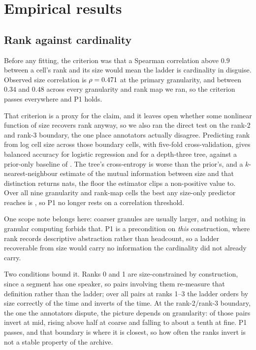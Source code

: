 \documentclass[conference]{IEEEtran}
\begin{document}
\section{Empirical results}

\subsection{Rank against cardinality}

Before any fitting, the criterion was that a Spearman correlation above $0.9$ between a cell's
rank and its size would mean the ladder is cardinality in disguise. Observed size
correlation is
$\rho = 0.471{}$ at the primary granularity, and between $0.34$ and $0.48$ across
every granularity and rank map we ran, so the criterion passes everywhere and P1 holds.

That criterion is a proxy for the claim, and it
leaves open whether some nonlinear function of size recovers rank anyway, so
we also ran the direct test on the rank-2 and rank-3 boundary, the one place annotators
actually disagree. Predicting rank from log cell size across those \sizeOnlyN{} boundary
cells, with
five-fold cross-validation, gives balanced accuracy \sizeOnlyLogit{} for logistic regression
and \sizeOnlyTree{} for a depth-three tree, against a prior-only baseline of
\sizeOnlyPrior{}. The tree's cross-entropy is worse than the prior's, and a
$k$-nearest-neighbour estimate of the mutual information between size and that distinction
returns \sizeOnlyMI{} nats, the floor the estimator clips a non-positive value to. Over all
nine granularity and rank-map cells the best any size-only predictor reaches is
\sizeOnlyMax{}, so P1 no longer rests on a correlation threshold.

One scope note belongs here: coarser granules are usually larger, and nothing in granular
computing forbids that. P1 is a precondition on \emph{this} construction, where rank
records
descriptive abstraction rather than headcount, so a ladder recoverable from size would carry
no information the cardinality did not already carry.

Two conditions bound it. Ranks 0 and 1 are
size-constrained by construction, since a segment has one speaker, so pairs involving them
re-measure that definition rather than the ladder; over all pairs at ranks 1--3 the ladder
orders by size correctly \concordanceRate{} of the time and inverts \inversionRate{} of the
time. At the rank-2/rank-3 boundary, the one the annotators dispute, the picture depends on
granularity: \invTwoThree{} of those \pairsTwoThree{} pairs invert at mid, rising above half
at coarse and falling to about a tenth at fine. P1 passes, and that boundary is where it is
closest, so how often the ranks invert is not a stable property of the archive.
\end{document}
